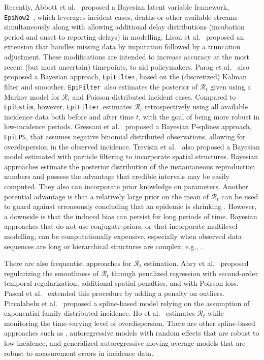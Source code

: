 \documentclass[10pt,letterpaper]{article}
\def\EpiEstim{\texttt{EpiEstim}}
\def\EpiLPS{\texttt{EpiLPS}}
\def\EpiFilter{\texttt{EpiFilter}}
\def\EpiNow2{\texttt{EpiNow2}}
\def\calR{\mathcal{R}}
\begin{document}
Recently, Abbott et al.~\cite{abbott2020estimating} proposed a Bayesian latent
variable framework, \EpiNow2~\cite{EpiNow2}, which leverages incident cases,
deaths or other available streams simultaneously along with allowing additional
delay distributions (incubation period and onset to reporting delays) in
modelling. Lison et al.~\cite{lison2024generative} proposed an extension that
handles missing data by imputation followed by a truncation adjustment. These
modifications are intended to increase accuracy at the most recent (but most
uncertain) timepoints, to aid policymakers. Parag et
al.~\cite{parag2021improved} also proposed a Bayesian approach, \EpiFilter,
based on the (discretized) Kalman filter and smoother. \EpiFilter\ also
estimates the posterior of $\calR_t$ given using a Markov model for $\calR_t$
and Poisson distributed incident cases. Compared to \EpiEstim, however,
\EpiFilter\ estimates $\calR_t$ retrospectively using all available incidence
data both before and after time $t$, with the goal of being more robust in
low-incidence periods. Gressani et al.~\cite{gressani2022epilps} proposed a
Bayesian P-splines approach, \EpiLPS, that assumes negative binomial distributed
observations, allowing for overdispersion in the observed incidence. Trevisin et
al.~\cite{trevisin2023spatially} also proposed a Bayesian model estimated with
particle filtering to incorporate spatial structures. Bayesian approaches
estimate the posterior distribution of the instantaneous reproduction numbers
and possess the advantage that credible intervals may be easily computed. They
also can incorporate prior knowledge on parameters. Another potential advantage
is that a relatively large prior on the mean of $\calR_t$ can be used to guard
against erroneously concluding that an epidemic is shrinking
\cite{thompson2019improved}. However, a downside is that the induced bias can
persist for long periods of time. Bayesian approaches that do not use conjugate
priors, or that incorporate multilevel modelling, can be computationally
expensive, especially when observed data sequences are long or hierarchical
structures are complex, e.g., \cite{abbott2020estimating}. 


There are also frequentist approaches for $\calR_t$ estimation. Abry et
al.~\cite{abry2020spatial} proposed regularizing the smoothness of $\calR_t$
through penalized regression with second-order temporal regularization,
additional spatial penalties, and with Poisson loss. Pascal et
al.~\cite{pascal2022nonsmooth} extended this procedure by adding a penalty on
outliers. Pircalabelu et al.~\cite{pircalabelu2023spline} proposed a
spline-based model relying on the assumption of exponential-family distributed
incidence. Ho et al.~\cite{ho2023accounting} estimates $\calR_t$ while
monitoring the time-varying level of overdispersion. There are other
spline-based approaches such as
\cite{azmon2014estimation,gressani2021approximate}, autoregressive models with
random effects \cite{jin2023epimix} that are robust to low incidence, and
generalized autoregressive moving average models \cite{hettinger2023estimating}
that are robust to measurement errors in incidence data. 
\end{document}
